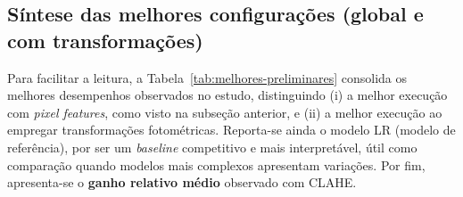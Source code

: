 \documentclass[11pt,a4paper]{article}
\begin{document}

\subsection{Síntese das melhores configurações (global e com transformações)}
Para facilitar a leitura, a Tabela~\ref{tab:melhores-preliminares} consolida os melhores desempenhos observados no estudo, distinguindo (i) a melhor execução com \textit{pixel features}, como visto na subseção anterior, e (ii) a melhor execução ao empregar transformações fotométricas. Reporta-se ainda o modelo LR (modelo de referência), por ser um \textit{baseline} competitivo e mais interpretável, útil como comparação quando modelos mais complexos apresentam variações. Por fim, apresenta-se o \textbf{ganho relativo médio} observado com CLAHE.
\end{document}
